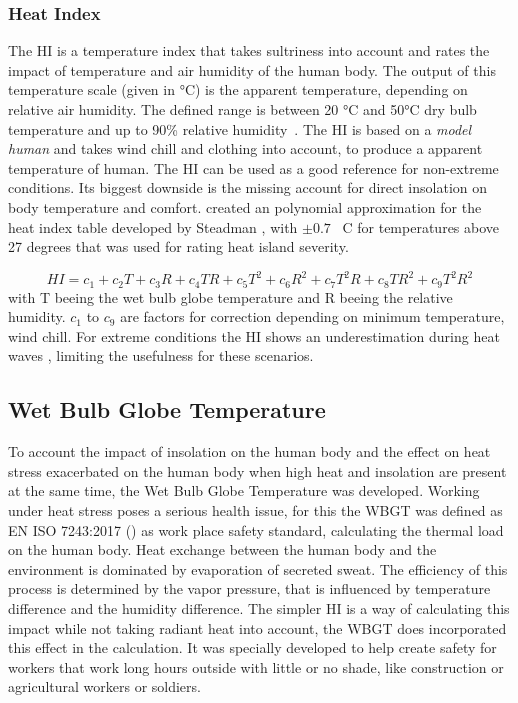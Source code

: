 \documentclass[12pt,a4paper, english,twoside]{scrartcl}
\begin{document}
    \subsubsection{Heat Index}\label{sec:heatIndex}
    The \gls{HI} is a temperature index that takes sultriness into account and rates the impact of temperature and air humidity of the human body. 
    The output of this temperature scale (given in °C) is the apparent temperature, depending on relative air humidity. 
    The defined range is between 20 °C and 50°C dry bulb temperature and up to 90\% relative humidity~\autocite[p. 862]{Steadman1979}. 
    The \gls{HI} is based on a \textit{model human} and takes wind chill and clothing into account, to produce a apparent temperature of human. 
    The \gls{HI} can be used as a good reference for non-extreme conditions. 
    Its biggest downside is the missing account for direct insolation on body temperature and comfort.
    \Cite{Schoen2005} created an polynomial approximation for the heat index table developed by Steadman \autocite{Steadman1979}, with $\pm 0.7$ \textdegree\ C for temperatures above 27 degrees that was used for rating heat island severity.

    \begin{equation}
      HI = c_1 + c_2 T + c_3 R + c_4 T R + c_5 T^2 + c_6 R^2 + c_7 T^2 R + c_8 T R^2 + c_9 T^2 R^2
    \end{equation}
    with T beeing the wet bulb globe temperature and R beeing the relative humidity. 
    $c_1$ to $c_9$ are factors for correction depending on minimum temperature, wind chill.
    For extreme conditions the \gls{HI} shows an underestimation during heat waves \autocite{Romps2022}, limiting the usefulness for these scenarios.
  \subsection{Wet Bulb Globe Temperature}
    To account the impact of insolation on the human body and the effect on heat stress exacerbated on the human body when high heat and insolation are present at the same time, the Wet Bulb Globe Temperature was developed. 
    Working under heat stress poses a serious health issue, for this the \gls{WBGT} was defined as EN ISO 7243:2017 (\cite{Iso7243_2017}) as work place safety standard, calculating the thermal load on the human body.
    Heat exchange between the human body and the environment is dominated by evaporation of secreted sweat.
    The efficiency of this process is determined by the vapor pressure, that is influenced by temperature difference and the humidity difference.
    The simpler \gls{HI} is a way of calculating this impact while not taking radiant heat into account, the WBGT does incorporated this effect in the calculation.
    It was specially developed to help create safety for workers that work long hours outside with little or no shade, like construction or agricultural workers or soldiers.
% 
% 
% 
% 
  \newpage
\end{document}
